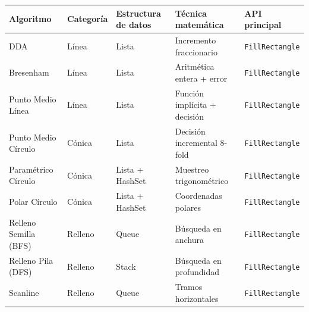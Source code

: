 \documentclass[
  spanish,
  a4paper,
  12pt,
]{article}
\newcommand{\passthrough}[1]{#1}
\newcounter{none} %
\begin{document}
{\def\LTcaptype{none} %
\begin{longtable}[]{@{}
  >{\raggedright\arraybackslash}p{}
  >{\raggedright\arraybackslash}p{}
  >{\raggedright\arraybackslash}p{}
  >{\raggedright\arraybackslash}p{}
  >{\raggedright\arraybackslash}p{}@{}}
\toprule\noalign{}
\begin{minipage}[b]{\linewidth}\raggedright
Algoritmo
\end{minipage} & \begin{minipage}[b]{\linewidth}\raggedright
Categoría
\end{minipage} & \begin{minipage}[b]{\linewidth}\raggedright
Estructura de datos
\end{minipage} & \begin{minipage}[b]{\linewidth}\raggedright
Técnica matemática
\end{minipage} & \begin{minipage}[b]{\linewidth}\raggedright
API principal
\end{minipage} \\
\midrule\noalign{}
\endhead
\bottomrule\noalign{}
\endlastfoot
DDA & Línea & Lista & Incremento fraccionario &
\passthrough{\lstinline!FillRectangle!} \\
Bresenham & Línea & Lista & Aritmética entera + error &
\passthrough{\lstinline!FillRectangle!} \\
Punto Medio Línea & Línea & Lista & Función implícita + decisión &
\passthrough{\lstinline!FillRectangle!} \\
Punto Medio Círculo & Cónica & Lista & Decisión incremental 8-fold &
\passthrough{\lstinline!FillRectangle!} \\
Paramétrico Círculo & Cónica & Lista + HashSet & Muestreo trigonométrico
& \passthrough{\lstinline!FillRectangle!} \\
Polar Círculo & Cónica & Lista + HashSet & Coordenadas polares &
\passthrough{\lstinline!FillRectangle!} \\
Relleno Semilla (BFS) & Relleno & Queue & Búsqueda en anchura &
\passthrough{\lstinline!FillRectangle!} \\
Relleno Pila (DFS) & Relleno & Stack & Búsqueda en profundidad &
\passthrough{\lstinline!FillRectangle!} \\
Scanline & Relleno & Queue & Tramos horizontales &
\passthrough{\lstinline!FillRectangle!} \\
\end{longtable}
}
\end{document}
